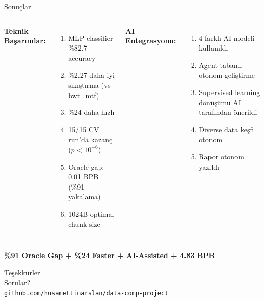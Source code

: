 \documentclass[10pt,aspectratio=43]{beamer}
\begin{document}
\begin{frame}{Sonuçlar}
  \begin{columns}[T]
    \textbf{Teknik Başarımlar:}
    \vspace{0.3em}
    \begin{enumerate}
      \setlength{\itemsep}{0.4em}
      \item MLP classifier \%82.7 accuracy
      \item \alert{\%2.27 daha iyi sıkıştırma} (vs bwt\_mtf)
      \item \alert{\%24 daha hızlı}
      \item 15/15 CV run'da kazanç ($p < 10^{-6}$)
      \item Oracle gap: 0.01 BPB (\%91 yakalama)
      \item 1024B optimal chunk size
    \end{enumerate}

    \textbf{AI Entegrasyonu:}
    \vspace{0.3em}
    \begin{enumerate}
      \setlength{\itemsep}{0.4em}
      \item 4 farklı AI modeli kullanıldı
      \item Agent tabanlı otonom geliştirme
      \item Supervised learning dönüşümü AI tarafından önerildi
      \item Diverse data keşfi otonom
      \item Rapor otonom yazıldı
    \end{enumerate}
  \end{columns}

  \vspace{0.5em}
  \begin{center}
    \Large\textbf{\%91 Oracle Gap + \%24 Faster + AI-Assisted + 4.83 BPB}
  \end{center}
\end{frame}

\begin{frame}[plain,c]
  \LARGE Teşekkürler \\[0.5em]
  \large Sorular? \\[1em]
  \normalsize
  \texttt{github.com/husamettinarslan/data-comp-project}
\end{frame}
\end{document}
